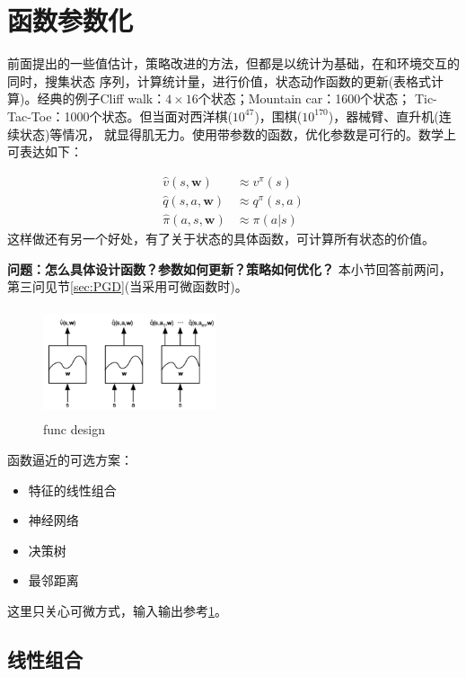 \documentclass[UTF8]{ctexart}
\begin{document}
\section{函数参数化}
前面提出的一些值估计，策略改进的方法，但都是以统计为基础，在和环境交互的同时，搜集状态
序列，计算统计量，进行价值，状态动作函数的更新(表格式计算)。经典的例子Cliff walk：$4\times 16$个状态；Mountain car：1600个状态；
Tic-Tac-Toe：1000个状态。但当面对西洋棋($10^{47}$)，围棋($10^{170}$)，器械臂、直升机(连续状态)等情况，
就显得肌无力。使用带参数的函数，优化参数是可行的。数学上可表达如下：

\begin{equation}
    \begin{aligned}
    \hat{v}(s, \mathbf{w}) & \approx v^{\pi}(s) \\
    \hat{q}(s, a, \mathbf{w}) & \approx q^{\pi}(s, a) \\
    \hat{\pi}(a, s, \mathbf{w}) & \approx \pi(a | s)
    \end{aligned}
\end{equation}
这样做还有另一个好处，有了关于状态的具体函数，可计算所有状态的价值。

\textbf{问题：怎么具体设计函数？参数如何更新？策略如何优化？}
本小节回答前两问，第三问见节\ref{sec:PGD}(当采用可微函数时)。

\begin{figure}[htbp]
	\centering
	\includegraphics[width=5.1cm, height=3.2cm]{./pic/func_design.png}
    \caption{func design}
    \label{func:design}
\end{figure}

函数逼近的可选方案：
\begin{itemize}
    \item 特征的线性组合
    \item 神经网络
    \item 决策树
    \item 最邻距离
\end{itemize}
这里只关心可微方式，输入输出参考\ref{func:design}。

\subsection{线性组合}
\end{document}
